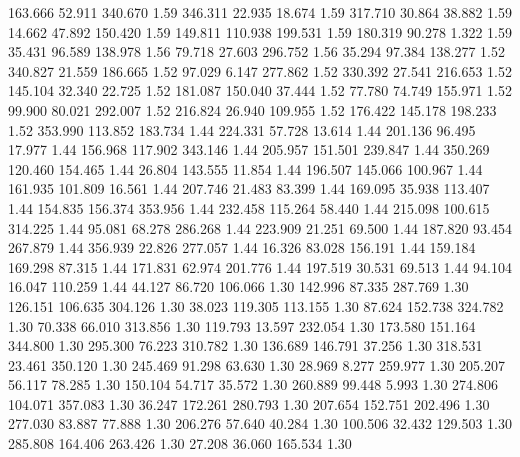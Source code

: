  163.666   52.911  340.670         1.59
 346.311   22.935   18.674         1.59
 317.710   30.864   38.882         1.59
  14.662   47.892  150.420         1.59
 149.811  110.938  199.531         1.59
 180.319   90.278    1.322         1.59
  35.431   96.589  138.978         1.56
  79.718   27.603  296.752         1.56
  35.294   97.384  138.277         1.52
 340.827   21.559  186.665         1.52
  97.029    6.147  277.862         1.52
 330.392   27.541  216.653         1.52
 145.104   32.340   22.725         1.52
 181.087  150.040   37.444         1.52
  77.780   74.749  155.971         1.52
  99.900   80.021  292.007         1.52
 216.824   26.940  109.955         1.52
 176.422  145.178  198.233         1.52
 353.990  113.852  183.734         1.44
 224.331   57.728   13.614         1.44
 201.136   96.495   17.977         1.44
 156.968  117.902  343.146         1.44
 205.957  151.501  239.847         1.44
 350.269  120.460  154.465         1.44
  26.804  143.555   11.854         1.44
 196.507  145.066  100.967         1.44
 161.935  101.809   16.561         1.44
 207.746   21.483   83.399         1.44
 169.095   35.938  113.407         1.44
 154.835  156.374  353.956         1.44
 232.458  115.264   58.440         1.44
 215.098  100.615  314.225         1.44
  95.081   68.278  286.268         1.44
 223.909   21.251   69.500         1.44
 187.820   93.454  267.879         1.44
 356.939   22.826  277.057         1.44
  16.326   83.028  156.191         1.44
 159.184  169.298   87.315         1.44
 171.831   62.974  201.776         1.44
 197.519   30.531   69.513         1.44
  94.104   16.047  110.259         1.44
  44.127   86.720  106.066         1.30
 142.996   87.335  287.769         1.30
 126.151  106.635  304.126         1.30
  38.023  119.305  113.155         1.30
  87.624  152.738  324.782         1.30
  70.338   66.010  313.856         1.30
 119.793   13.597  232.054         1.30
 173.580  151.164  344.800         1.30
 295.300   76.223  310.782         1.30
 136.689  146.791   37.256         1.30
 318.531   23.461  350.120         1.30
 245.469   91.298   63.630         1.30
  28.969    8.277  259.977         1.30
 205.207   56.117   78.285         1.30
 150.104   54.717   35.572         1.30
 260.889   99.448    5.993         1.30
 274.806  104.071  357.083         1.30
  36.247  172.261  280.793         1.30
 207.654  152.751  202.496         1.30
 277.030   83.887   77.888         1.30
 206.276   57.640   40.284         1.30
 100.506   32.432  129.503         1.30
 285.808  164.406  263.426         1.30
  27.208   36.060  165.534         1.30
